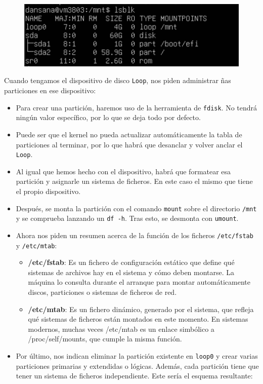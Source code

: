 \documentclass[10pt]{article}
\begin{document}
	\begin{figure}[H]
		\setlength{\abovecaptionskip}{0cm}
		\setlength{\belowcaptionskip}{0cm}
		\centering
		\includegraphics[width=0.6\linewidth]{Recursos/loop0.png}
	\end{figure}
	
	Cuando tengamos el dispositivo de disco \verb|Loop|, nos piden administrar ñas particiones en ese dispositivo:
	\begin{itemize}
		\item Para crear una partición, haremos uso de la herramienta de \verb|fdisk|. No tendrá ningún valor específico, por lo que se deja todo por defecto.
		\item Puede ser que el kernel no pueda actualizar automáticamente la tabla de particiones al terminar, por lo que habrá que desanclar y volver anclar el \verb|Loop|.
		\item Al igual que hemos hecho con el dispositivo, habrá que formatear esa partición y asignarle un sistema de ficheros. En este caso el mismo que tiene el propio dispositivo.
		\item Después, se monta la partición con el comando \verb|mount| sobre el directorio \verb|/mnt| y se comprueba lanzando un \verb|df -h|. Tras esto, se desmonta con \verb|umount|.
		\item Ahora nos piden un resumen acerca de la función de los ficheros \verb|/etc/fstab| y \verb|/etc/mtab|:
		\begin{itemize}
			\item \textbf{/etc/fstab}: Es un fichero de configuración estático que define qué sistemas de archivos hay en el sistema y cómo deben montarse. La máquina lo consulta durante el arranque para montar automáticamente discos, particiones o sistemas de ficheros de red.
			\item \textbf{/etc/mtab}: Es un fichero dinámico, generado por el sistema, que refleja qué sistemas de ficheros están montados en este momento. En sistemas modernos, muchas veces /etc/mtab es un enlace simbólico a /proc/self/mounts, que cumple la misma función.
		\end{itemize}
		\item Por último, nos indican eliminar la partición existente en \verb|loop0| y crear varias particiones primarias y extendidas o lógicas. Además, cada partición tiene que tener un sistema de ficheros independiente. Este sería el esquema resultante:

\end{itemize}
\end{document}
